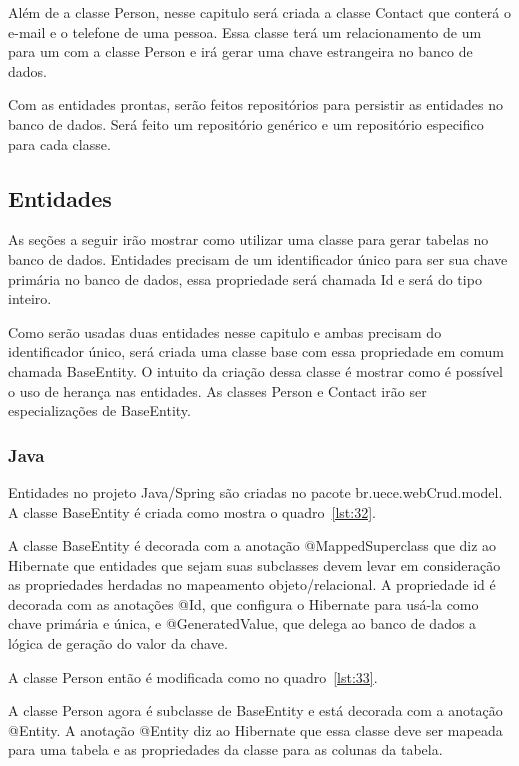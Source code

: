 \documentclass[a4paper,12pt]{article}
\newcommand{\javacode}[3] {
	
	\FloatBarrier
}
\begin{document}
Além de a classe Person, nesse capitulo será criada a classe Contact que conterá o e-mail e o telefone de uma pessoa. Essa classe terá um relacionamento de um para um com a classe Person e irá gerar uma chave estrangeira no banco de dados.

Com as entidades prontas, serão feitos repositórios para persistir as entidades no banco de dados. Será feito um repositório genérico e um repositório especifico para cada classe.

\subsection{Entidades}

As seções a seguir irão mostrar como utilizar uma classe para gerar tabelas no banco de dados. Entidades precisam de um identificador único para ser sua chave primária no banco de dados, essa propriedade será chamada Id e será do tipo inteiro.

Como serão usadas duas entidades nesse capitulo e ambas precisam do identificador único, será criada uma classe base com essa propriedade em comum chamada BaseEntity. O intuito da criação dessa classe é mostrar como é possível o uso de herança nas entidades. As classes Person e Contact irão ser especializações de BaseEntity.

\subsubsection{Java}

Entidades no projeto Java/Spring são criadas no pacote br.uece.webCrud.model. A classe BaseEntity é criada como mostra o quadro~\ref{lst:32}.

\javacode{code/32.txt}{Classe BaseEntity no projeto Java}{lst:32}

A classe BaseEntity é decorada com a anotação @MappedSuperclass que diz ao Hibernate que entidades que sejam suas subclasses devem levar em consideração as propriedades herdadas no mapeamento objeto/relacional. A propriedade id é decorada com as anotações @Id, que configura o Hibernate para usá-la como chave primária e única, e @GeneratedValue, que delega ao banco de dados a lógica de geração do valor da chave.

A classe Person então é modificada como no quadro~\ref{lst:33}.

\javacode{code/33.txt}{Classe Person herda de BaseEntity}{lst:33}

A classe Person agora é subclasse de BaseEntity e está decorada com a anotação @Entity. A anotação @Entity diz ao Hibernate que essa classe deve ser mapeada para uma tabela e as propriedades da classe para as colunas da tabela.
\end{document}
